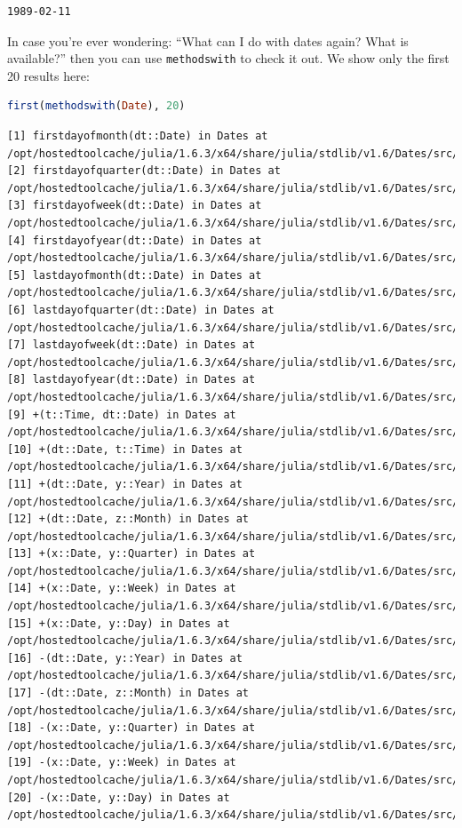 \documentclass[
  notoc %
]{tufte-book}
\newcommand{\passthrough}[1]{#1}
\begin{document}
\begin{lstlisting}[language=Output]
1989-02-11
\end{lstlisting}

In case you're ever wondering: ``What can I do with dates again? What is
available?'' then you can use \passthrough{\lstinline!methodswith!} to
check it out. We show only the first 20 results here:

\begin{lstlisting}[language=Julia]
first(methodswith(Date), 20)
\end{lstlisting}

\begin{lstlisting}[language=Output]
[1] firstdayofmonth(dt::Date) in Dates at /opt/hostedtoolcache/julia/1.6.3/x64/share/julia/stdlib/v1.6/Dates/src/adjusters.jl:84
[2] firstdayofquarter(dt::Date) in Dates at /opt/hostedtoolcache/julia/1.6.3/x64/share/julia/stdlib/v1.6/Dates/src/adjusters.jl:157
[3] firstdayofweek(dt::Date) in Dates at /opt/hostedtoolcache/julia/1.6.3/x64/share/julia/stdlib/v1.6/Dates/src/adjusters.jl:52
[4] firstdayofyear(dt::Date) in Dates at /opt/hostedtoolcache/julia/1.6.3/x64/share/julia/stdlib/v1.6/Dates/src/adjusters.jl:119
[5] lastdayofmonth(dt::Date) in Dates at /opt/hostedtoolcache/julia/1.6.3/x64/share/julia/stdlib/v1.6/Dates/src/adjusters.jl:100
[6] lastdayofquarter(dt::Date) in Dates at /opt/hostedtoolcache/julia/1.6.3/x64/share/julia/stdlib/v1.6/Dates/src/adjusters.jl:180
[7] lastdayofweek(dt::Date) in Dates at /opt/hostedtoolcache/julia/1.6.3/x64/share/julia/stdlib/v1.6/Dates/src/adjusters.jl:68
[8] lastdayofyear(dt::Date) in Dates at /opt/hostedtoolcache/julia/1.6.3/x64/share/julia/stdlib/v1.6/Dates/src/adjusters.jl:135
[9] +(t::Time, dt::Date) in Dates at /opt/hostedtoolcache/julia/1.6.3/x64/share/julia/stdlib/v1.6/Dates/src/arithmetic.jl:20
[10] +(dt::Date, t::Time) in Dates at /opt/hostedtoolcache/julia/1.6.3/x64/share/julia/stdlib/v1.6/Dates/src/arithmetic.jl:19
[11] +(dt::Date, y::Year) in Dates at /opt/hostedtoolcache/julia/1.6.3/x64/share/julia/stdlib/v1.6/Dates/src/arithmetic.jl:27
[12] +(dt::Date, z::Month) in Dates at /opt/hostedtoolcache/julia/1.6.3/x64/share/julia/stdlib/v1.6/Dates/src/arithmetic.jl:54
[13] +(x::Date, y::Quarter) in Dates at /opt/hostedtoolcache/julia/1.6.3/x64/share/julia/stdlib/v1.6/Dates/src/arithmetic.jl:73
[14] +(x::Date, y::Week) in Dates at /opt/hostedtoolcache/julia/1.6.3/x64/share/julia/stdlib/v1.6/Dates/src/arithmetic.jl:77
[15] +(x::Date, y::Day) in Dates at /opt/hostedtoolcache/julia/1.6.3/x64/share/julia/stdlib/v1.6/Dates/src/arithmetic.jl:79
[16] -(dt::Date, y::Year) in Dates at /opt/hostedtoolcache/julia/1.6.3/x64/share/julia/stdlib/v1.6/Dates/src/arithmetic.jl:35
[17] -(dt::Date, z::Month) in Dates at /opt/hostedtoolcache/julia/1.6.3/x64/share/julia/stdlib/v1.6/Dates/src/arithmetic.jl:66
[18] -(x::Date, y::Quarter) in Dates at /opt/hostedtoolcache/julia/1.6.3/x64/share/julia/stdlib/v1.6/Dates/src/arithmetic.jl:74
[19] -(x::Date, y::Week) in Dates at /opt/hostedtoolcache/julia/1.6.3/x64/share/julia/stdlib/v1.6/Dates/src/arithmetic.jl:78
[20] -(x::Date, y::Day) in Dates at /opt/hostedtoolcache/julia/1.6.3/x64/share/julia/stdlib/v1.6/Dates/src/arithmetic.jl:80
\end{lstlisting}
\end{document}
